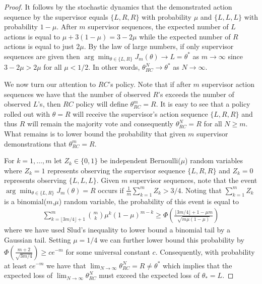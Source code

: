 \documentclass[10pt, conference]{ieeeconf}      %
\begin{document}
\begin{proof}
It follows by the stochastic dynamics that the demonstrated action sequence by the supervisor equals $\{L,R,R\}$ with probability $\mu$ and $\{L,L,L\}$ with probability $1-\mu$.
After $m$ supervisor sequences, the expected number of $L$ actions is equal to $\mu+3(1-\mu)=3-2\mu$ while the expected number of $R$ actions is equal to just $2\mu$.
By the law of large numbers, if only supervisor sequences are given then $\arg\min_{\theta \in \{L,R\}} J_m(\theta) \rightarrow L = \theta^*$ as $m \rightarrow \infty$ since $3-2\mu>2\mu$ for all $\mu<1/2$. 
In other words, $\theta_{HC}^N \rightarrow \theta^*$ as $N \rightarrow \infty$.

We now turn our attention to $RC$'s policy.
Note that if after $m$ supervisor action sequences we have that the number of observed $R$'s exceeds the number of observed $L$'s, then $RC$ policy will define $\theta_{RC}^m = R$. 
It is easy to see that a policy rolled out with $\theta=R$ will receive the supervisor's action sequence $\{L,R,R\}$ and thus $R$ will remain the majority vote and consequently $\theta_{RC}^N=R$ for all $N \geq m$.
What remains is to lower bound the probability that given $m$ supervisor demonstrations that $\theta_{RC}^m = R$. 

For $k=1,\dots,m$ let $Z_k \in \{0,1\}$ be independent Bernoulli($\mu$) random variables where $Z_k=1$ represents observing the supervisor sequence $\{L,R,R\}$ and $Z_k=0$ represents observing $\{L,L,L\}$.
Given $m$ supervisor sequences, note that the event $\arg\min_{\theta \in \{L,R\}} J_m(\theta) = R$ occurs if $\frac{1}{m}\sum_{k=1}^m Z_k > 3/4$. 
Noting that $\sum_{k=1}^m Z_k$ is a binomial($m$,$\mu$) random variable, the probability of this event is equal to 
\begin{align*}
\sum_{k=\lfloor 3m/4 \rfloor+1}^m \binom{m}{k} \mu^k (1-\mu)^{m-k} \geq \Phi\left( \frac{\lfloor 3m/4 \rfloor+1 - \mu m}{ \sqrt{m \mu(1-\mu)}} \right) 
\end{align*} 
where we have used Slud's inequality \cite{slud1977} to lower bound a binomial tail by a Gaussian tail. 
Setting $\mu=1/4$ we can further lower bound this probability by $\Phi\left( \frac{m + 2}{ \sqrt{3m/4}} \right) \geq c e^{-m}$ for some universal constant $c$.
Consequently, with probability at least $c e^{-m}$ we have that $\lim_{N \rightarrow \infty} \theta_{RC}^N = R \neq \theta^*$ which implies that the expected loss of $\lim_{N \rightarrow \infty} \theta_{RC}^N$ must exceed the expected loss of $\theta_*=L$.
\end{proof}
\end{document}
